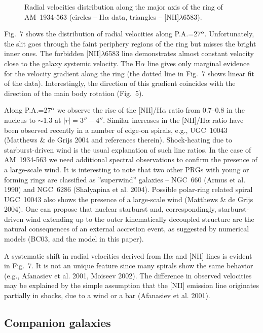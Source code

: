\documentclass[]{aa}
\begin{document}
\begin{figure}
\centerline{}
\caption{Radial velocities distribution along the major axis of
the ring of AM~1934-563 (circles -- H$\alpha$ data, triangles -- 
[NII]$\lambda$6583).}
\end{figure}

Fig.~7 shows the distribution of radial velocities along 
P.A.=27$^{\rm o}$. Unfortunately, the slit goes through the faint 
periphery regions of the ring but misses the bright inner ones. The 
forbidden [NII]$\lambda$6583 line demonstrates almost
constant velocity close to the galaxy systemic velocity.
The H$\alpha$ line gives only marginal evidence for the velocity 
gradient along the ring (the dotted line in Fig.~7 shows linear
fit of the data). Interestingly, the direction of this gradient
coincides with the direction of the main body rotation (Fig.~5).

Along P.A.=27$^{\rm o}$ we observe the rise of the [NII]/H$\alpha$
ratio from 0.7--0.8 in the nucleus to $\sim$1.3 at $\mid r \mid =
3''-4''$. Similar increases in the [NII]/H$\alpha$ ratio have 
been observed recently in a number of edge-on spirals, e.g., UGC~10043
(Matthews \& de Grijs 2004 and references therein). Shock-heating
due to starburst-driven wind is the usual explanation of such line ratios.
In the case of AM~1934-563 we need additional spectral observations
to confirm the presence of a large-scale wind. It is interesting to
note that two other PRGs with young or forming rings are classified as
 ''superwind'' galaxies -- NGC~660 (Armus et al. 1990)  and
NGC~6286 (Shalyapina et al. 2004). Possible polar-ring related
spiral UGC~10043 also shows the presence of a large-scale wind
(Matthews \& de Grijs 2004). One can propose that nuclear
starburst and, correspondingly, starburst-driven wind extending up 
to the outer kinematically decoupled structure are the natural consequences
of an external accretion event, as suggested by numerical models (BC03, 
and the model in this paper).

A systematic shift in radial velocities derived from H$\alpha$ and
[NII] lines is evident in Fig.~7. It is not an unique feature
since many spirals show the same behavior (e.g., Afanasiev et al. 2001,
Moiseev 2002). The difference in observed velocities may be
explained by the simple assumption that the [NII] emission line 
originates partially in shocks, 
due to a wind or a bar (Afanasiev et al. 2001).

\subsection{Companion galaxies}
\end{document}
